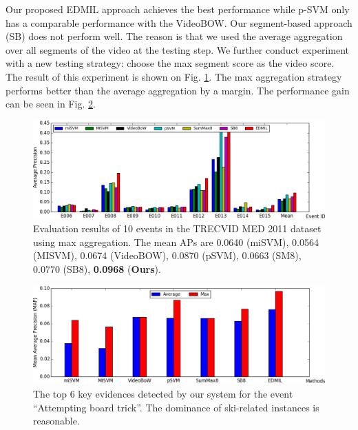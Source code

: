Our proposed EDMIL approach achieves the best performance while p-SVM only has a comparable performance with the VideoBOW. Our segment-based approach (SB) does not perform well. The reason is that we used the average aggregation over all segments of the video at the testing step. We further conduct experiment with a new testing strategy: choose the max segment score as the video score. The result of this experiment is shown on Fig. \ref{med11_max}. The max aggregation strategy performs better than the average aggregation by a margin. The performance gain can be seen in Fig. \ref{med11_gain}. 

\begin{figure}
	\centering
	\includegraphics[width=1\textwidth]{med11_max.png}
	\caption{Evaluation results of 10 events in the TRECVID MED 2011 dataset using max aggregation. The mean APs are 0.0640 (miSVM), 0.0564 (MISVM), 0.0674 (VideoBOW), 0.0870 (pSVM), 0.0663 (SM8), 0.0770 (SB8), \textbf{0.0968} (\textbf{Ours}).}
	\label{med11_max}
\end{figure}

\begin{figure}
	\centering
	\includegraphics[width=1\textwidth]{med11_gain.png}
	\caption{The top 6 key evidences detected by our system for the event ``Attempting board trick''. The dominance of ski-related instances is reasonable.}
	\label{med11_gain}
\end{figure}

